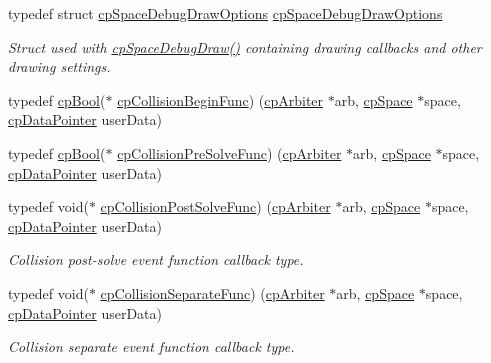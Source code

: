 \begin{DoxyCompactItemize}
typedef struct \hyperlink{structcpSpaceDebugDrawOptions}{cp\+Space\+Debug\+Draw\+Options} \hyperlink{group__cpSpace_gabb44b3d40332bc5965e8dbd515caa71a}{cp\+Space\+Debug\+Draw\+Options}
\begin{DoxyCompactList}\small\item\em Struct used with \hyperlink{group__cpSpace_ga02e8a34681aff3f29bd976e830f3b6da}{cp\+Space\+Debug\+Draw()} containing drawing callbacks and other drawing settings. \end{DoxyCompactList}\item 
typedef \hyperlink{group__basicTypes_gabc5e752c48f3449ca26ef413ecbd647e}{cp\+Bool}($\ast$ \hyperlink{group__cpSpace_ga3134f145bfc7ca4ef69b350978c26a5a}{cp\+Collision\+Begin\+Func}) (\hyperlink{structcpArbiter}{cp\+Arbiter} $\ast$arb, \hyperlink{structcpSpace}{cp\+Space} $\ast$space, \hyperlink{group__basicTypes_ga2ac2c3c31e21893941f9e4f8ee279447}{cp\+Data\+Pointer} user\+Data)
\item 
typedef \hyperlink{group__basicTypes_gabc5e752c48f3449ca26ef413ecbd647e}{cp\+Bool}($\ast$ \hyperlink{group__cpSpace_ga89b24d53d81a5a028198c3c2d3c39a9d}{cp\+Collision\+Pre\+Solve\+Func}) (\hyperlink{structcpArbiter}{cp\+Arbiter} $\ast$arb, \hyperlink{structcpSpace}{cp\+Space} $\ast$space, \hyperlink{group__basicTypes_ga2ac2c3c31e21893941f9e4f8ee279447}{cp\+Data\+Pointer} user\+Data)
\item 
\mbox{\label{group__cpSpace_gaccb60bbb090c97823f49ee49e4e5d3c3}} 
typedef void($\ast$ \hyperlink{group__cpSpace_gaccb60bbb090c97823f49ee49e4e5d3c3}{cp\+Collision\+Post\+Solve\+Func}) (\hyperlink{structcpArbiter}{cp\+Arbiter} $\ast$arb, \hyperlink{structcpSpace}{cp\+Space} $\ast$space, \hyperlink{group__basicTypes_ga2ac2c3c31e21893941f9e4f8ee279447}{cp\+Data\+Pointer} user\+Data)
\begin{DoxyCompactList}\small\item\em Collision post-\/solve event function callback type. \end{DoxyCompactList}\item 
\mbox{\label{group__cpSpace_ga01427ab634c483879cfed5bb22610487}} 
typedef void($\ast$ \hyperlink{group__cpSpace_ga01427ab634c483879cfed5bb22610487}{cp\+Collision\+Separate\+Func}) (\hyperlink{structcpArbiter}{cp\+Arbiter} $\ast$arb, \hyperlink{structcpSpace}{cp\+Space} $\ast$space, \hyperlink{group__basicTypes_ga2ac2c3c31e21893941f9e4f8ee279447}{cp\+Data\+Pointer} user\+Data)
\begin{DoxyCompactList}\small\item\em Collision separate event function callback type. \end{DoxyCompactList}\item 

\end{DoxyCompactItemize}
